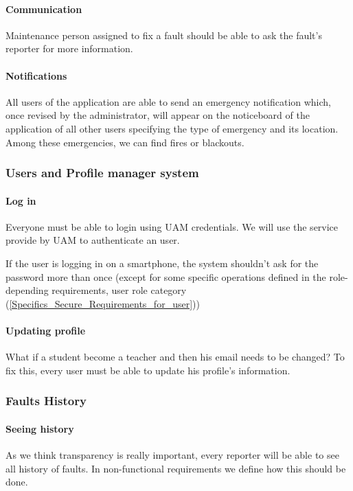 \paragraph{Communication} Maintenance person assigned to fix a fault should be able to ask the fault's reporter for more information.

\paragraph{Notifications} All users of the application are able to send an emergency notification which, once revised by the administrator, will appear on the noticeboard of the application of all other users specifying the type of emergency and its location. Among these emergencies, we can find fires or blackouts.

\subsubsection{Users and Profile manager system}

\paragraph{Log in} Everyone must be able to login using UAM credentials. We will use the service provide by UAM to authenticate an user.

If the user is logging in on a smartphone, the system shouldn't ask for the password more than once (except for some specific operations defined in the role-depending requirements, user role category (\ref{Specifics_Secure_Requirements_for_user}))

\paragraph{Updating profile} What if a student become a teacher and then his email needs to be changed? To fix this, every user must be able to update his profile's information.


\subsubsection{Faults History}

\paragraph{Seeing history} As we think transparency is really important, every reporter will be able to see all history of faults. In non-functional requirements we define how this should be done.

